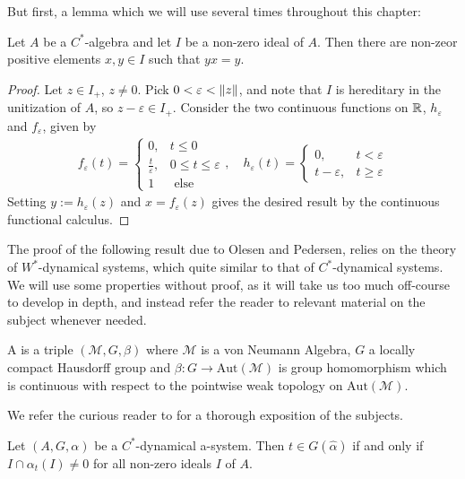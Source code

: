 But first, a lemma which we will use several times throughout this chapter:
\begin{lemma}
	Let $A$ be a $C^*$-algebra and let $I$ be a non-zero ideal of $A$. Then there are non-zeor positive elements $x,y \in I$ such that $yx = y$.
	\label{poselyx}
\end{lemma}
\begin{proof}
	Let $z \in I_+$, $z \neq 0$. Pick $0 < \varepsilon < \left\lVert z\right\rVert$, and note that $I$ is hereditary in the unitization of $A$, so $z-\varepsilon \in I_+$. Consider the two continuous functions on $\mathbb{R}$, $h_\varepsilon$ and $f_{\varepsilon}$, given by
	\begin{align*}
		f_\varepsilon(t) = \begin{cases}
			0, & t \leq 0\\
			\frac t \varepsilon, &  0 \leq t \leq \varepsilon\\
			1 & \text{ else}
		\end{cases}, \quad  h_\varepsilon(t) = \begin{cases}
			0, &  t < \varepsilon\\
			t-\varepsilon, & t \geq \varepsilon
		\end{cases}
	\end{align*}
	Setting $y := h_\varepsilon(z)$ and $x = f_\varepsilon(z)$ gives the desired result by the continuous functional calculus.
\end{proof}
\begin{remark}
	The proof of the following result due to Olesen and Pedersen, relies on the theory of $W^*$-dynamical systems, which quite similar to that of $C^*$-dynamical systems. We will use some properties without proof, as it will take us too much off-course to develop in depth, and instead refer the reader to relevant material on the subject whenever needed.	
\begin{definition}
	A  is a triple $(\mathscr{M},G,\beta)$ where $\mathscr{M}$ is a von Neumann Algebra, $G$ a locally compact Hausdorff group and $\beta \colon G \to \mathrm{Aut}(\mathscr{M})$ is group homomorphism which is continuous with respect to the pointwise weak topology on $\mathrm{Aut}(\mathscr{M})$.
\end{definition}
	 We refer the curious reader to \cite[Chapter 7.4 and 7.10]{pedersenalgauto} for a thorough exposition of the subjects.
\end{remark}
\begin{proposition}
	Let $(A, G, \alpha)$ be a $C^*$-dynamical a-system. Then $t \in G(\hat \alpha)$ if and only if $I \cap \alpha_t(I) \neq 0$ for all non-zero ideals $I$ of $A$.
	\label{connesideal1}
\end{proposition}
